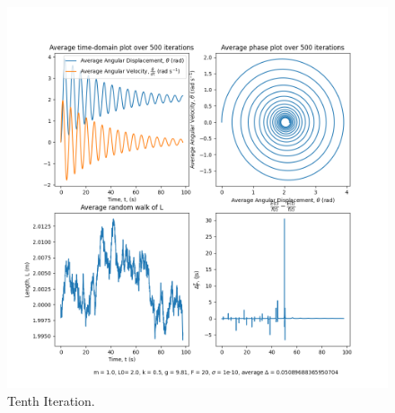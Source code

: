 \documentclass[10pt, twocolumn]{article}
\begin{document}
\begin{figure}[H]
    \centering
    \includegraphics[width = \columnwidth]{Projects/ForcedSimplePendulum/Plots/m = 1.0, L0= 2.0, k = 0.5, g = 9.81, F = 20, sigma = 1e-10, run number 9.png}
    \caption{Tenth Iteration.}
    \label{Tenth Iteration}
\end{figure}
\end{document}
